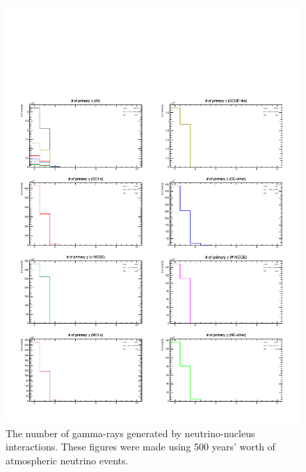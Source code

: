 \begin{figure}[h]
	\centering
	\includegraphics[width=16cm]{PDF/NEUT/s1_2_official/gamma/NumPri}
	\caption[The number of gamma-rays generated by neutrino-nucleus interactions]{
	The number of gamma-rays generated by neutrino-nucleus interactions.
	These figures were made using 500 years' worth of atmospheric neutrino events.
	}\label{gammaNumPri}
\end{figure}


